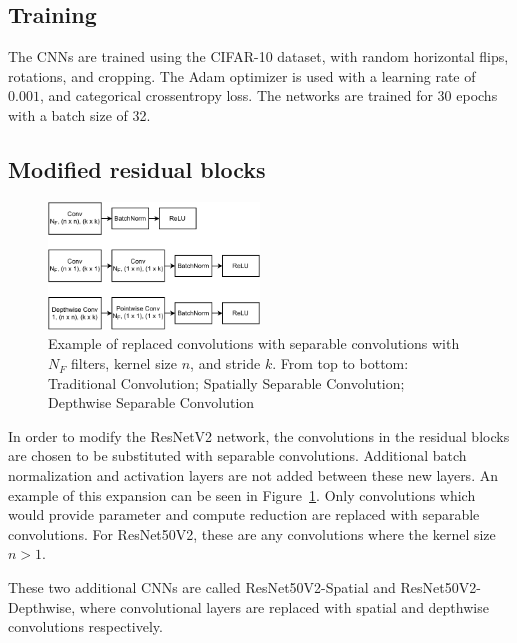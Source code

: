\documentclass{article}
\begin{document}
	\subsection{Training}
	
	The CNNs are trained using the CIFAR-10 dataset, with random horizontal flips, rotations, and cropping. The Adam optimizer is used with a learning rate of $0.001$, and categorical crossentropy loss. The networks are trained for 30 epochs with a batch size of 32. 
	
	\subsection{Modified residual blocks}
	
	\begin{figure}[h!]
		\centering
		\includegraphics[width=0.5\textwidth]{images/conv-structure.pdf}
		\caption{Example of replaced convolutions with separable convolutions with $N_F$ filters, kernel size $n$, and stride $k$. From top to bottom: Traditional Convolution; Spatially Separable Convolution; Depthwise Separable Convolution}
		\label{fig:conv-structure}
	\end{figure}
	
	In order to modify the ResNetV2 network, the convolutions in the residual blocks are chosen to be substituted with separable convolutions. Additional batch normalization and activation layers are not added between these new layers. An example of this expansion can be seen in Figure~\ref{fig:conv-structure}. Only convolutions which would provide parameter and compute reduction are replaced with separable convolutions. For ResNet50V2, these are any convolutions where the kernel size $n > 1$.
	
	These two additional CNNs are called ResNet50V2-Spatial and ResNet50V2-Depthwise, where convolutional layers are replaced with spatial and depthwise convolutions respectively. 
	
	
\end{document}
